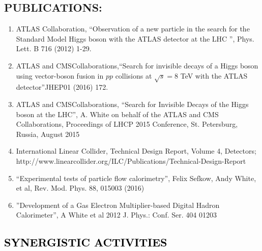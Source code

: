 \subsection[PUBLICATIONS:]{\color{black} PUBLICATIONS:}
\begin{enumerate}

\item{{{ATLAS }}Collaboration, ``Observation of a new particle in the search for the Standard Model Higgs boson 
with the ATLAS detector at the LHC '', Phys. Lett. B 716 (2012) 1-29.}

\item{{{ATLAS and CMS}}Collaborations,``Search for invisible decays of a Higgs boson using vector-boson fusion 
in $pp$ collisions at $\sqrt{s}=8$ TeV with the ATLAS detector''JHEP01 (2016) 172.}

\item{{{ATLAS and CMS}}Collaborations, ``Search for Invisible Decays of the Higgs boson at the LHC'',
A. White on behalf of the ATLAS and CMS Collaborations, Proceedings of LHCP 2015 Conference, St. Petersburg, Russia, August 2015}

\item{{\color{black}} {International Linear Collider, Technical Design Report, Volume 4, Detectors; 
http://www.linearcollider.org/ILC/Publications/Technical-Design-Report} }

\item{``Experimental tests of particle flow calorimetry'', Felix Sefkow, Andy White, et al, Rev. Mod. Phys. 88, 015003 (2016)}

\item{''Development of a Gas Electron Multiplier-based Digital Hadron Calorimeter'', A White et al 2012 J. Phys.: 
Conf. Ser. 404 01203}

\end{enumerate}


\subsection[SYNERGISTIC ACTIVITIES]{\textcolor{black}{SYNERGISTIC ACTIVITIES}}

